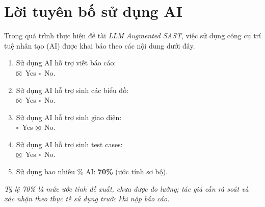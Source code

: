 \documentclass[11pt,a4paper]{article}
\newcommand{\unchecked}{\(\square\)}
\newcommand{\checked}{\(\boxtimes\)}
\begin{document}
\section*{Lời tuyên bố sử dụng AI}
Trong quá trình thực hiện đề tài \textit{LLM Augmented SAST}, việc sử dụng công cụ trí tuệ nhân tạo (AI) được khai báo theo các nội dung dưới đây.

\begin{enumerate}
  \item Sử dụng AI hỗ trợ viết báo cáo:\\
        \checked\ Yes \qquad \unchecked\ No.
  \item Sử dụng AI hỗ trợ sinh các biểu đồ:\\
        \checked\ Yes \qquad \unchecked\ No.
  \item Sử dụng AI hỗ trợ sinh giao diện:\\
        \unchecked\ Yes \qquad \checked\ No.
  \item Sử dụng AI hỗ trợ sinh test cases:\\
        \checked\ Yes \qquad \unchecked\ No.
  \item Sử dụng bao nhiêu \% AI: \textbf{70\%} (ước tính sơ bộ).
\end{enumerate}

\noindent\textit{Tỷ lệ 70\% là mức ước tính đề xuất, chưa được đo lường; tác giả cần rà soát và xác nhận theo thực tế sử dụng trước khi nộp báo cáo.}

\renewcommand{\contentsname}{Mục lục}
\tableofcontents
\clearpage
\end{document}
